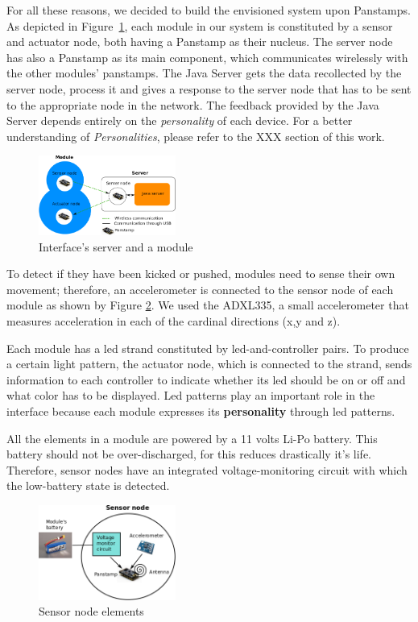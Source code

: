 For all these reasons, we decided to build the envisioned system upon Panstamps. As depicted in Figure~\ref{fig:server-module}, each module in our system is constituted by a sensor and actuator node, both having a Panstamp as their nucleus. The server node has also a Panstamp as its main component, which communicates wirelessly with the other modules' panstamps. The Java Server gets the data recollected by the server node, process it and gives a response to the server node that has to be sent to the appropriate node in the network. The feedback provided by the Java Server depends entirely on the \emph{personality} of each device. For a better understanding of \emph{Personalities}, please refer to the XXX section of this work.

\begin{figure}[h!]
 \centering
 \includegraphics[width= 0.4\textwidth, clip=true  ,keepaspectratio=true]{./graph/entity_server.png}
 \caption{Interface's server and a module}
 \label{fig:server-module}
\end{figure}

To detect if they have been kicked or pushed, modules need to sense their own movement; therefore, an accelerometer is connected to the sensor node of each module as shown by Figure \ref{fig:sensor-node}. We used the ADXL335, a small accelerometer that measures acceleration in each of the cardinal directions (x,y and z).

Each module has a led strand constituted by led-and-controller pairs. To produce a certain light pattern, the actuator node, which is connected to the strand, sends information to each controller to indicate whether its led should be on or off and what color has to be displayed. Led patterns play an important role in the interface because each module expresses its \textbf{personality} through led patterns.  

All the elements in a module are powered by a 11 volts Li-Po battery. This battery should not be over-discharged, for this reduces drastically it's life. Therefore, sensor nodes have an integrated voltage-monitoring circuit with which the low-battery state is detected.

\begin{figure}[h!]
 \centering
 \includegraphics[width= 0.4\textwidth, clip=true  ,keepaspectratio=true]{./graph/sensor_node.png}
 \caption{Sensor node elements}
 \label{fig:sensor-node}
\end{figure}


